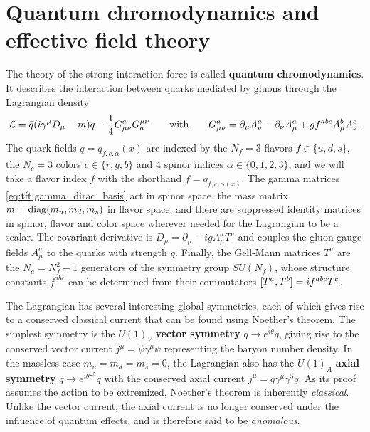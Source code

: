


\section{Quantum chromodynamics and effective field theory}

The theory of the strong interaction force is called \textbf{quantum chromodynamics}.
It describes the interaction between quarks mediated by gluons through the Lagrangian density
\begin{equation}
	\mathcal{L} = \bar{q} ( i \gamma^\mu D_\mu - m ) q - \frac14 G_{\mu\nu}^a G^{\mu\nu}_a
	\qquad \text{with} \qquad
	G_{\mu\nu}^a = \partial_\mu A_\nu^a - \partial_\nu A_\mu^a + g f^{abc} A_\mu^b A_\nu^c.
\end{equation}
The quark fields $q = q_{f,c,\alpha}(x)$ are indexed by
the $N_f = 3$ flavors $f \in \{u,d,s\}$,
the $N_c = 3$ colors $c \in \{r,g,b\}$ and
$4$ spinor indices $\alpha \in \{0,1,2,3\}$,
and we will take a flavor index $f$ with the shorthand $f = q_{f,c,\alpha(x)}$.
The gamma matrices \eqref{eq:tft:gamma_dirac_basis} act in spinor space,
the mass matrix $m = \operatorname{diag}(m_u, m_d, m_s)$ in flavor space,
and there are suppressed identity matrices in spinor, flavor and color space wherever needed for the Lagrangian to be a scalar.
The covariant derivative is $D_\mu = \partial_\mu - i g A_\mu^a T^a$ and couples the gluon gauge fields $A_\mu^a$ to the quarks with strength $g$.
Finally, the Gell-Mann matrices $T^a$ are the $N_a = N_f^2 - 1$ generators of the symmetry group $SU(N_f)$,
whose structure constants $f^{abc}$ can be determined from their commutators $[ T^a , T^b ] = i f^{abc} T^c$.

The Lagrangian has several interesting global symmetries, each of which gives rise to a conserved classical current that can be found using Noether's theorem.
The simplest symmetry is the $U(1)_V$ \textbf{vector symmetry} $q \rightarrow e^{i \theta} q$, giving rise to the conserved vector current $j^\mu = \bar\psi \gamma^\mu \psi$ representing the baryon number density.
In the massless case $m_u = m_d = m_s = 0$, the Lagrangian also has the $U(1)_A$ \textbf{axial symmetry} $q \rightarrow e^{i \theta \gamma^5} q$ with the conserved axial current $j^\mu = \bar{q} \gamma^\mu \gamma^5 q$.
As its proof assumes the action to be extremized, Noether's theorem is inherently \emph{classical}.
Unlike the vector current, the axial current is no longer conserved under the influence of quantum effects, and is therefore said to be \emph{anomalous}.


